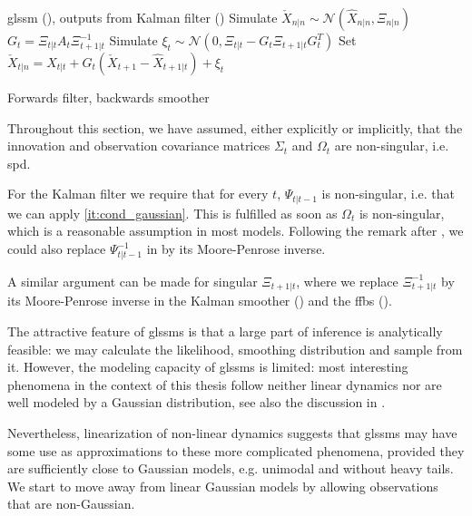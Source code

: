 \begin{algorithm}
    \begin{algorithmic}
        \Require \acrshort{glssm} (), outputs from Kalman filter ()
        \State Simulate $\check X_{n|n} \sim \mathcal N(\hat X_{n|n}, \Xi_{n|n})$
            \State $G_{t} = \Xi_{t|t}A_{t}\Xi^{-1}_{t + 1 | t}$
            \State Simulate $\xi_{t} \sim \mathcal N(0, \Xi_{t|t} - G_{t}\Xi_{t+1|t}G^{T}_t)$
            \State Set $\check X_{t|n} = \hat X_{t|t} + G_{t} \left( \check X_{t + 1} - \hat X_{t + 1| t} \right) + \xi_{t}$
        \EndFor
    \end{algorithmic}
    \caption{Forwards filter, backwards smoother \citep[Proposition 1]{Fruhwirth-Schnatter1994Data}} \label{alg:ffbs}
\end{algorithm}

\begin{remark}
    \label{rem:regular_covs}
    Throughout this section, we have assumed, either explicitly or implicitly, that the innovation and observation covariance matrices $\Sigma_{t}$ and $\Omega_{t}$ are non-singular, i.e. \acrshort{spd}.

    For the Kalman filter we require that for every $t$, $\Psi_{t|t-1}$ is non-singular, i.e. that we can apply  \ref{it:cond_gaussian}. This is fulfilled as soon as $\Omega_{t}$ is non-singular, which is a reasonable assumption in most models. Following the remark after , we could also replace $\Psi_{t|t-1}^{-1}$ in  by its Moore-Penrose inverse. 

    A similar argument can be made for singular $\Xi_{t+1|t}$, where we replace $\Xi_{t+1|t}^{-1}$ by its Moore-Penrose inverse in the Kalman smoother () and the \acrshort{ffbs} (). 
\end{remark}


The attractive feature of \glspl{glssm} is that a large part of inference is analytically feasible: we may calculate the likelihood, smoothing distribution and sample from it. 
However, the modeling capacity of \glspl{glssm} is limited: most interesting phenomena in the context of this thesis follow neither linear dynamics nor are well modeled by a Gaussian distribution, see also the discussion in .

Nevertheless, linearization of non-linear dynamics suggests that \gls{glssm}s may have some use as approximations to these more complicated phenomena, provided they are sufficiently close to Gaussian models, e.g. unimodal and without heavy tails.
We start to move away from linear Gaussian models by allowing observations that are non-Gaussian.